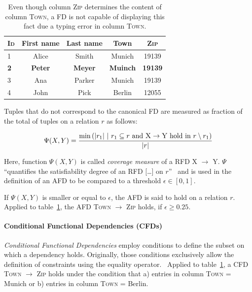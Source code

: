 \begin{table}[ht]
    \centering
    \begin{tabular}{lcccc}
        \toprule
        \toprule
        \textsc{Id} & First name & Last name & Town & \textsc{Zip} \\
        \midrule
        1 & Alice & Smith & Munich & 19139 \\
        \textbf{2} & \textbf{Peter}& \textbf{Meyer} &
        \textbf{Muinch} & \textbf{19139} \\
        3 & Ana & Parker & Munich & 19139  \\
        4 & John & Pick & Berlin & 12055 \\
        \bottomrule
        \bottomrule
    \end{tabular}
    \caption{Even though column \textsc{Zip} determines the content of column \textsc{Town}, a FD is not capable of displaying this fact due a typing error in column \textsc{Town}.}
    \label{tab:example-afd-necessity}
\end{table}

Tuples that do not correspond to the canonical FD are measured as fraction of the total of tuples on a relation \( r \) as follows:

\begin{align}
    \Psi(X, Y) = \frac{\min{\left(|r_1|~|~r_1 \subseteq r \text{ and } \textsc{X} \rightarrow \textsc{Y} \text{ hold in } r \setminus r_1 \right)}}{|r|}
\end{align}

Here, function \( \Psi(X, Y) \) is called \emph{coverage measure} of a RFD \textsc{X} \( \to \) \textsc{Y}.
\( \Psi \) ``quantifies the satisfiability degree of an RFD [\dots] on \( r \)''~\cite[p.~150]{CAR16} and is used in the definition of an AFD to be compared to a threshold \( \epsilon \in [0, 1] \).

If \( \Psi(X, Y) \) is smaller or equal to \( \epsilon \), the AFD is said to hold on a relation \( r \).
Applied to table~\ref{tab:example-afd-necessity}, the AFD \textsc{Town} \( \to \) \textsc{Zip} holds, if \( \epsilon \geq 0.25\).

\paragraph{Conditional Functional Dependencies (CFDs)}
\emph{Conditional Functional Dependencies} employ conditions to define the subset on which a dependency holds.
Originally, those conditions exclusively allow the definition of constraints using the equality operator.~\cite[p.~152]{CAR16}
Applied to table~\ref{tab:example-afd-necessity}, a CFD \textsc{Town} \( \to\) \textsc{Zip} holds under the condition that a) entries in column \textsc{Town} = Munich or b) entries in column \textsc{Town} = Berlin.

